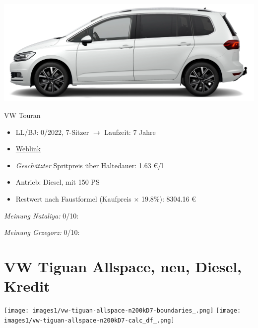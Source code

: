 \documentclass[landscape, DIV=99, 14pt]{scrartcl}
\begin{document}
\pagebreak
\begin{center}
\includegraphics[width=0.9\columnwidth]{cars/vw-touran-neu-benzin.png}

VW Touran
\end{center}

\begin{itemize}
    \item LL/BJ: 0/2022, 7-Sitzer $\rightarrow$ Laufzeit: 7 Jahre
    \item \href{https://www.volkswagen.de/de/konfigurator.html/__app/touran/touran/highline.app?buildabilityStatus-app=buildable&category-app=private&carlineId-app=31000&salesGroupId-app=32600&trimName-app=Highline&modelId-app=5T146Z%24GYORYOR&modelVersion-app=1&modelYear-app=2022&exteriorId-app=F14+0Q0Q&interiorId-app=F56+++++BG&options-app=GWBGWBG-GPG3PG3-MAHV1M6-GPF9PF9-GRBDRBD-MKSUKA1-MSSH4KF-GP19P19-MVTV9IJ-GWQ1WQ1}{Weblink}
    \item \emph{Gesch\"atzter} Spritpreis \"uber Haltedauer: 1.63 \euro{}/l
    \item Antrieb: Diesel, mit 150 PS
    \item Restwert nach Faustformel (Kaufpreis $\times$ 19.8\%): 8304.16 \euro{}
\end{itemize}

\begin{small}
\emph{Meinung Nataliya:} 0/10: 
        
\emph{Meinung Grzegorz:} 0/10: 
\end{small}

\pagebreak


\twocolumn

\section*{VW Tiguan Allspace, neu, Diesel, Kredit}
\begin{center}
\texttt{[image: images1/vw-tiguan-allspace-n200kD7-boundaries\_.png]}
\null
\vspace{0.5cm}
\texttt{[image: images1/vw-tiguan-allspace-n200kD7-calc\_df\_.png]}
\end{center}
\end{document}
